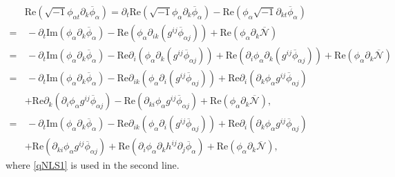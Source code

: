 \documentclass[10pt,twoside,a4paper]{article}
\numberwithin{equation}{section}\allowdisplaybreaks
\begin{document}
	\begin{align} \label{cons1_3}
	&\mathrm{Re}\left( \sqrt{-1}\phi_{\alpha t} \partial_k \overline{\phi}_\alpha\right)=\partial_t \mathrm{Re}\left( \sqrt{-1}\phi_{\alpha } \partial_k \overline{\phi}_\alpha \right)-\mathrm{Re}\left( \phi_{\alpha } \sqrt{-1} \partial_{kt} \overline{\phi}_\alpha\right)\nonumber\\
	=&\,-\partial_t \mathrm{Im}\left( \phi_{\alpha } \partial_k \overline{\phi}_\alpha \right)-\mathrm{Re}\left( \phi_{\alpha }  \partial_{ik}\left( g^{ij} \overline{\phi}_{\alpha j}\right)\right)+\mathrm{Re}\left( \phi_{\alpha } \partial_k\overline{\mathcal{N}} \right)\\
	=&\,-\partial_t \mathrm{Im}\left(\phi_{\alpha } \partial_k \overline{\phi}_\alpha \right)-\mathrm{Re}\partial_i\left( \phi_{\alpha }  \partial_{k}\left( g^{ij} \overline{\phi}_{\alpha j}\right)\right)+\mathrm{Re}\left(\partial_i \phi_{\alpha }  \partial_{k}\left( g^{ij} \overline{\phi}_{\alpha j}\right)\right)+\mathrm{Re}\left( \phi_{\alpha } \partial_k\overline{\mathcal{N}} \right)  \nonumber\\
	=&\,-\partial_t \mathrm{Im}\left( \phi_{\alpha } \partial_k \overline{\phi}_\alpha \right)-\mathrm{Re}\partial_{ik}\left( \phi_{\alpha }  \partial_{i}\left( g^{ij} \overline{\phi}_{\alpha j}\right)\right)+ \mathrm{Re}\partial_{i}\left(\partial_k \phi_{\alpha }  g^{ij} \overline{\phi}_{\alpha j}\right)\nonumber\\
	&+ \mathrm{Re}\partial_{k}\left(\partial_i \phi_{\alpha }  g^{ij} \overline{\phi}_{\alpha j}\right)-\mathrm{Re}\left(\partial_{ki} \phi_{\alpha }  g^{ij} \overline{\phi}_{\alpha j}\right)+\mathrm{Re}\left( \phi_{\alpha } \partial_k\overline{\mathcal{N}} \right), \nonumber\\
		=&\,-\partial_t \mathrm{Im}\left( \phi_{\alpha } \partial_k \overline{\phi}_\alpha \right)-\mathrm{Re}\partial_{ik}\left( \phi_{\alpha }  \partial_{i}\left( g^{ij} \overline{\phi}_{\alpha j}\right)\right)+ \mathrm{Re}\partial_{i}\left(\partial_k \phi_{\alpha }  g^{ij} \overline{\phi}_{\alpha j}\right)\nonumber\\
	&+\mathrm{Re}\left(\partial_{ki} \phi_{\alpha }  g^{ij} \overline{\phi}_{\alpha j}\right)+ \mathrm{Re}\left(\partial_{i} \phi_{\alpha }  \partial_k h^{ij} \partial_j \overline{\phi}_{\alpha }\right)+\mathrm{Re}\left( \phi_{\alpha } \partial_k\overline{\mathcal{N}} \right), \nonumber
\end{align}
where  \eqref{qNLS1} is used in the second line.
\end{document}
